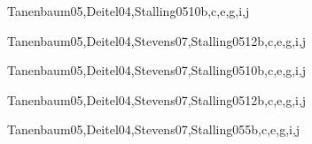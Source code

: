 \begin{syllabus}
\begin{unit}{\PBDWebPlatforms}{}{Tanenbaum05,Deitel04,Stalling05}{10}{b,c,e,g,i,j}
        \PBDWebPlatformsAllTopics
        \PBDWebPlatformsAllLearningOutcomes
\end{unit}

\begin{unit}{\NCNetworkedApplications}{}{Tanenbaum05,Deitel04,Stevens07,Stalling05}{12}{b,c,e,g,i,j}
        \NCNetworkedApplicationsAllTopics
        \NCNetworkedApplicationsAllLearningOutcomes
\end{unit}

\begin{unit}{\NCResourceAllocation}{}{Tanenbaum05,Deitel04,Stevens07,Stalling05}{10}{b,c,e,g,i,j}
        \NCResourceAllocationAllTopics
        \NCResourceAllocationAllLearningOutcomes
\end{unit}

\begin{unit}{\IMMultimediaSystems}{}{Tanenbaum05,Deitel04,Stevens07,Stalling05}{12}{b,c,e,g,i,j}
        \IMMultimediaSystemsAllTopics
        \IMMultimediaSystemsAllLearningOutcomes
\end{unit}

\begin{unit}{\NCMobility}{}{Tanenbaum05,Deitel04,Stevens07,Stalling05}{5}{b,c,e,g,i,j}
        \NCMobilityAllTopics
        \NCMobilityAllLearningOutcomes
\end{unit}

\begin{coursebibliography}
\end{coursebibliography}

\end{syllabus}

%
